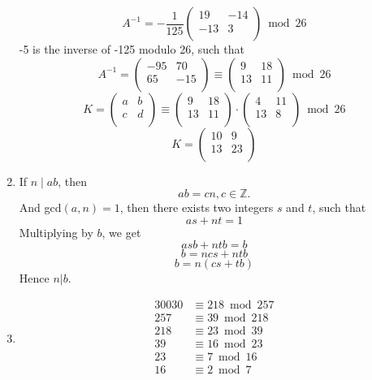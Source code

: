 \documentclass[a4paper]{article}
\begin{document}
\begin{enumerate}
		$$A^{-1}=-\frac{1}{125}
		\left(
		\begin{matrix}
			19  & -14 \\
			-13 & 3 \\
		\end{matrix}
		\right) \bmod 26
		$$
		-5 is the inverse of -125 modulo 26, such that
		$$A^{-1}=
		\left(
		\begin{matrix}
			-95 & 70 \\
			65  & -15 \\
		\end{matrix}
		\right)
		\equiv
		\left(
		\begin{matrix}
			9 & 18 \\
			13 & 11 \\
		\end{matrix}
		\right)
		\bmod 26
		$$
		$$K=
		\left(
		\begin{matrix}
			a & b \\
			c & d \\
		\end{matrix}
		\right)
		\equiv
		\left(
		\begin{matrix}
			9 & 18 \\
			13 & 11 \\
		\end{matrix}
		\right)
		\cdot
		\left(
		\begin{matrix}
			4  & 11 \\
			13 & 8 \\
		\end{matrix}
		\right) \bmod 26
		$$
		$$K =
		\left(
		\begin{matrix}
			10  & 9 \\
			13 & 23 \\
		\end{matrix}
		\right)
		$$
	\item
	If $n\mid ab$, then $$ab = cn, c \in \mathbb{Z}.$$
	And gcd$(a, n) = 1$, then there exists two integers $s$ and $t$, such that
	$$as + nt = 1$$
	Multiplying by $b$, we get
	$$asb + ntb = b$$
	$$b = ncs + ntb$$
	$$b = n(cs + tb)$$
	Hence $n|b$.
	\item
	$$
	\begin{aligned}
		30030 &\equiv 218 \bmod 257\\
		257 &\equiv 39 \bmod 218\\
		218 &\equiv 23 \bmod 39\\
		39 &\equiv 16 \bmod 23\\
		23 &\equiv 7 \bmod 16\\
		16 &\equiv 2 \bmod 7\\

\end{aligned}$$
\end{enumerate}
\end{document}
